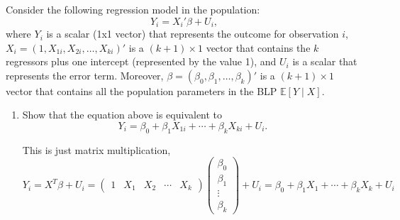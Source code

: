 \documentclass[11pt]{article}
\begin{document}
Consider the following regression model in the population:
\[
Y_i = X_i' \beta + U_i,
\]
where \( Y_i \) is a scalar (1x1 vector) that represents the outcome for observation \( i \), \( X_i = (1, X_{1i}, X_{2i}, \ldots, X_{ki})' \) is a \( (k+1) \times 1 \) vector that contains the \( k \) regressors plus one intercept (represented by the value 1), and \( U_i \) is a scalar that represents the error term. Moreover, \( \beta = (\beta_0, \beta_1, \ldots, \beta_k)' \) is a \( (k+1) \times 1 \) vector that contains all the population parameters in the BLP \( \mathbb{E}[Y \mid X] \).

\begin{enumerate}[label=(\alph*)]
    \item Show that the equation above is equivalent to
    \[
    Y_i = \beta_0 + \beta_1 X_{1i} + \cdots + \beta_k X_{ki} + U_i.
    \]
    \begin{solution}
        This is just matrix multiplication, 
        \[Y_i = X^T\beta + U_i  = \begin{pmatrix}
    1 & X_1 & X_2 & \cdots &X_k
        \end{pmatrix}\begin{pmatrix}
            \beta_0 \\ \beta_1\\ \vdots \\\beta_k
        \end{pmatrix} + U_i = \beta_0 + \beta_1 X_1 + \cdots + \beta_kX_k + U_i\]
    \end{solution}
    

\end{enumerate}
\end{document}
